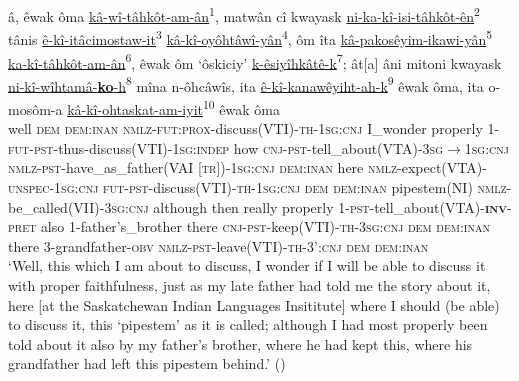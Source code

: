 \documentclass[twoside,a4paper,11pt]{article}
\newcommand{\sg}{\textsc{sg}}
\newcommand{\Σ}{\greek{Σ}}
\newcommand{\cnj}{\textsc{cnj}}
\newcommand{\dem}{\textsc{dem}}
\newcommand{\fut}{\textsc{fut}}
\newcommand{\inan}{\textsc{inan}}
\newcommand{\indep}{\textsc{indep}}
\newcommand{\inv}{\textsc{inv}}
\newcommand{\nmlz}{\textsc{nmlz}}
\newcommand{\obv}{\textsc{obv}}
\newcommand{\pret}{\textsc{pret}}
\newcommand{ \prox}{\textsc{prox}}
\newcommand{\pst}{\textsc{pst}}
\newcommand{\theme}{\textsc{th}}
\newcommand{\tr}{\textsc{tr}}
\newcommand{\unspec}{\textsc{unspec}}
\begin{document}
\begin{exe}
\ex \label{ex:creeverbs}
 \gll â, êwak ôma \underline{kâ-wî-tâhkôt-am-ân}\textsf{\textsuperscript{1}}, {matwân cî} kwayask \underline{ni-ka-kî-isi-tâhkôt-ên}\textsf{\textsuperscript{2}} tânis \underline{ê-kî-itâcimostaw-it}\textsf{\textsuperscript{3}} \underline{kâ-kî-oyôhtâwî-yân}\textsf{\textsuperscript{4}}, ôm îta \underline{kâ-pakosêyim-ikawi-yân}\textsf{\textsuperscript{5}} \underline{ka-kî-tâhkôt-am-ân}\textsf{\textsuperscript{6}}, êwak ôm `ôskiciy' \underline{k-êsiyîhkâtê-k}\textsf{\textsuperscript{7}}; ât[a] âni mitoni kwayask \underline{ni-kî-wîhtamâ-\textbf{ko}-h}\textsf{\textsuperscript{8}} mîna n-ôhcâwîs, ita \underline{ê-kî-kanawêyiht-ah-k}\textsf{\textsuperscript{9}} êwak ôma, ita o-mosôm-a \underline{kâ-kî-ohtaskat-am-iyit}\textsf{\textsuperscript{10}} êwak ôma\\
well {\dem} {\dem{:}\inan} {\nmlz-\fut{:}\prox-discuss(VTI)-\theme-1\sg{:}\cnj} {I\_wonder} properly {1-\fut-\pst-thus-discuss(VTI)-1\sg:\indep} how {\cnj-\pst-tell\_about(VTA)-3\sg$\rightarrow$1\sg{:}\cnj} {\nmlz-\pst-have\_as\_father(VAI [\tr])-1\sg{:}\cnj} {\dem{:}\inan} here {\nmlz-expect(VTA)-\unspec-1\sg{:}\cnj} {\fut-\pst-discuss(VTI)-\theme-1\sg{:}\cnj} {\dem} {\dem{:}\inan} {pipestem(NI)} {\nmlz-be\_called(VII)-3\sg{:}\cnj} although then really properly {1-\pst-tell\_about(VTA)-\textbf{\inv}-\pret} {also} {1-father's\_brother} there {\cnj-\pst-keep(VTI)-\theme-3\sg{:}\cnj} {\dem} {\dem{:}\inan} there {3-grandfather-\obv} {\nmlz-\pst-leave(VTI)-\theme-3'{:}\cnj} {\dem} {\dem{:}\inan}\\
\glt `Well, this which I am about to discuss, I wonder if I will be able to discuss it with proper faithfulness, just as my late father had told me the story about it, here [at the Saskatchewan Indian Languages Insititute] where I should (be able) to discuss it, this `pipestem' as it is called; although I had most properly been told about it also by my father's brother, where he had kept this, where his grandfather had left this pipestem behind.' (\citealp[p. 107]{counselling})
\end{exe}
\end{document}
